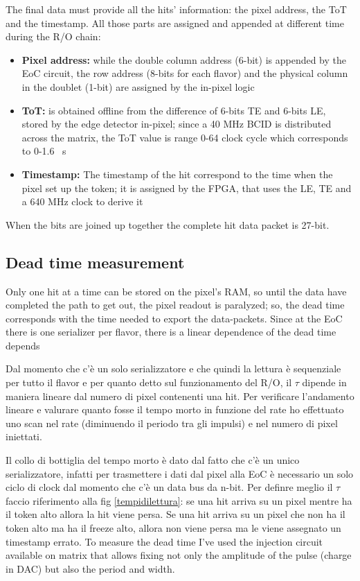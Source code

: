    
    The final data must provide all the hits' information: the pixel address, the ToT and the timestamp. All those parts are assigned and appended at different time during the R/O chain:  
    \begin{itemize}
        \item\textbf{Pixel address:} while the double column address (6-bit) is appended by the EoC circuit, the row address (8-bits for each flavor) and the physical column in the doublet (1-bit) are assigned by the in-pixel logic      
        \item \textbf{ToT:} is obtained offline from the difference of 6-bits TE and 6-bits LE, stored by the edge detector in-pixel; since a 40 MHz BCID is distributed across the matrix, the ToT value is range 0-64 clock cycle which corresponds to 0-1.6 \si{\mu s}  
        \item \textbf{Timestamp:} The timestamp of the hit correspond to the time when the pixel set up the token; it is assigned by the FPGA, that uses the LE, TE and a 640 MHz clock to derive it
    \end{itemize}
    When the bits are joined up together the complete hit data packet is 27-bit. 

    \subsection{Dead time measurement}
        Only one hit at a time can be stored on the pixel's RAM, so until the data have completed the path to get out, the pixel readout is paralyzed; so, the dead time corresponds with the time needed to export the data-packets. 
        Since at the EoC there is one serializer per flavor, there is a linear dependence of the dead time depends 
        
        Dal momento che c'è un solo serializzatore e che quindi la lettura è sequenziale per tutto il flavor e per quanto detto sul funzionamento del R/O, il $\tau$ dipende in maniera lineare dal numero di pixel contenenti una hit. Per verificare l'andamento lineare e valurare quanto fosse il tempo morto in funzione del rate ho effettuato uno scan nel rate (diminuendo il periodo tra gli impulsi) e nel numero di pixel iniettati. 

        Il collo di bottiglia del tempo morto è dato dal fatto che c'è un unico serializzatore, infatti per trasmettere i dati dal pixel alla EoC è necessario un solo ciclo di clock dal momento che c'è un data bus da n-bit. 
        Per definre meglio il $\tau$ faccio riferimento alla fig \ref{tempidilettura}: se una hit arriva su un pixel mentre ha il token alto allora la hit viene persa. Se una hit arriva su un pixel che non ha il token alto ma ha il freeze alto, allora non viene persa ma le viene assegnato un timestamp errato. 
        To measure the dead time I've used the injection circuit available on matrix that allows fixing not only the amplitude of the pulse (charge in DAC) but also the period and width. 

